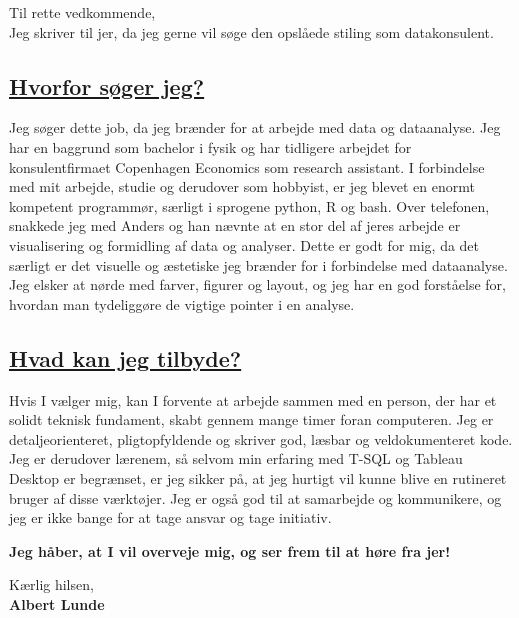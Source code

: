 \subject{Ansøgning om datakonsulent stilling ved AUH}
\coverletter[sender=true, vspace=4mm]

Til rette vedkommende,\\

Jeg skriver til jer, da jeg gerne vil søge den opslåede stiling som datakonsulent. 
\vspace{2mm}
\subsection*{\underline{Hvorfor søger jeg?}}
\vspace{2mm}
Jeg søger dette job, da jeg brænder for at arbejde med data og dataanalyse. Jeg har en baggrund som bachelor i fysik og har tidligere arbejdet for konsulentfirmaet Copenhagen Economics som research assistant. I forbindelse med mit arbejde, studie og derudover som hobbyist, er jeg blevet en enormt kompetent programmør, særligt i sprogene python, R og bash. Over telefonen, snakkede jeg med Anders og han nævnte at en stor del af jeres arbejde er visualisering og formidling af data og analyser. Dette er godt for mig, da det særligt er det visuelle og æstetiske jeg brænder for i forbindelse med dataanalyse. Jeg elsker at nørde med farver, figurer og layout, og jeg har en god forståelse for, hvordan man tydeliggøre de vigtige pointer i en analyse.
\vspace{2mm}
\subsection*{\underline{Hvad kan jeg tilbyde?}}
\vspace{2mm}
Hvis I vælger mig, kan I forvente at arbejde sammen med en person, der har et solidt teknisk fundament, skabt gennem mange timer foran computeren. Jeg er detaljeorienteret, pligtopfyldende og skriver god, læsbar og veldokumenteret kode. Jeg er derudover lærenem, så selvom min erfaring med T-SQL og Tableau Desktop er begrænset, er jeg sikker på, at jeg hurtigt vil kunne blive en rutineret bruger af disse værktøjer. Jeg er også god til at samarbejde og kommunikere, og jeg er ikke bange for at tage ansvar og tage initiativ. 

\vspace*{5mm}
\centerline{\textbf{Jeg håber, at I vil overveje mig, og ser frem til at høre fra jer!}}
\vspace*{5mm}

Kærlig hilsen, \\

\textbf{Albert Lunde}

